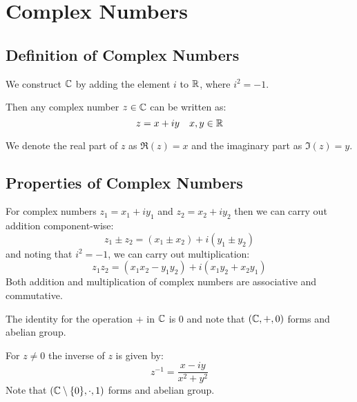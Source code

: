 \documentclass[../main.tex]{subfiles}
\begin{document}
\chapter{Complex Numbers}
\section{Definition of Complex Numbers}
\begin{definition}
  We construct $\mathbb{C}$ by adding the element $i$ to $\mathbb{R}$, where $i^2 = -1$.

  Then any complex number $z \in \mathbb{C}$ can be written as:
  \[
    z = x + iy \quad x, y \in \mathbb{R}
  \]
\end{definition}
We denote the real part of $z$ as $\Re(z) = x$ and the imaginary part as $\Im(z) = y$.
\section{Properties of Complex Numbers}
For complex numbers $z_1 = x_1 + i y_1$ and $z_2 = x_2 + i y_2$ then we can carry out addition component-wise:
\[
  z_1 \pm z_2 = (x_1 \pm x_2) + i(y_ 1 \pm y_2) 
\]
and noting that $i^2 = -1$, we can carry out multiplication:
\begin{equation}
  z_1 z_2 = (x_1 x_2 - y_1 y_2) + i(x_1 y_2 + x_2 y_1)
  \label{complexMult}
\end{equation}
Both addition and multiplication of complex numbers are associative and commutative.

The identity for the operation $+$ in $\mathbb{C}$ is 0 and note that $(\mathbb{C}, +, 0)$ forms and abelian group. 

For $z \neq 0$ the inverse of $z$ is given by:
\begin{equation}
  z^{-1} = \frac{x - iy}{x^2 + y^2}
  \label{inverse}
\end{equation}
Note that $(\mathbb{C} \setminus \{0\}, \cdot, 1)$ forms and abelian group.
\end{document}
